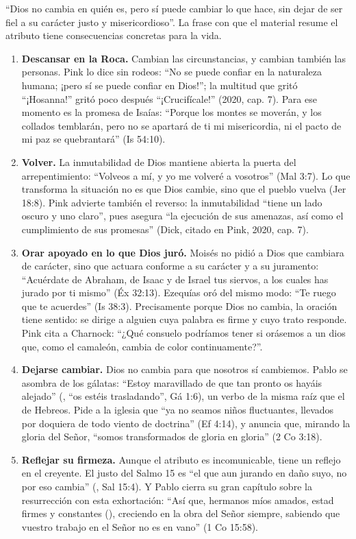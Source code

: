 ``Dios no cambia en quién es, pero sí puede cambiar lo que hace, sin dejar de ser fiel a su carácter justo y misericordioso''. La frase con que el material resume el atributo tiene consecuencias concretas para la vida.

\begin{enumerate}
\item \textbf{Descansar en la Roca.} Cambian las circunstancias, y cambian también las personas. Pink lo dice sin rodeos: ``No se puede confiar en la naturaleza humana; ¡pero sí se puede confiar en Dios!''; la multitud que gritó ``¡Hosanna!'' gritó poco después ``¡Crucifícale!'' (2020, cap. 7). Para ese momento es la promesa de Isaías: ``Porque los montes se moverán, y los collados temblarán, pero no se apartará de ti mi misericordia, ni el pacto de mi paz se quebrantará'' (Is 54:10).

\item \textbf{Volver.} La inmutabilidad de Dios mantiene abierta la puerta del arrepentimiento: ``Volveos a mí, y yo me volveré a vosotros'' (Mal 3:7). Lo que transforma la situación no es que Dios cambie, sino que el pueblo vuelva (Jer 18:8). Pink advierte también el reverso: la inmutabilidad ``tiene un lado oscuro y uno claro'', pues asegura ``la ejecución de sus amenazas, así como el cumplimiento de sus promesas'' (Dick, citado en Pink, 2020, cap. 7).

\item \textbf{Orar apoyado en lo que Dios juró.} Moisés no pidió a Dios que cambiara de carácter, sino que actuara conforme a su carácter y a su juramento: ``Acuérdate de Abraham, de Isaac y de Israel tus siervos, a los cuales has jurado por ti mismo'' (Éx 32:13). Ezequías oró del mismo modo: ``Te ruego que te acuerdes'' (Is 38:3). Precisamente porque Dios no cambia, la oración tiene sentido: se dirige a alguien cuya palabra es firme y cuyo trato responde. Pink cita a Charnock: ``¿Qué consuelo podríamos tener si orásemos a un dios que, como el camaleón, cambia de color continuamente?''.

\item \textbf{Dejarse cambiar.} Dios no cambia para que nosotros sí cambiemos. Pablo se asombra de los gálatas: ``Estoy maravillado de que tan pronto os hayáis alejado'' (, ``os estéis trasladando'', Gá 1:6), un verbo de la misma raíz que el  de Hebreos. Pide a la iglesia que ``ya no seamos niños fluctuantes, llevados por doquiera de todo viento de doctrina'' (Ef 4:14), y anuncia que, mirando la gloria del Señor, ``somos transformados de gloria en gloria'' (2 Co 3:18).

\item \textbf{Reflejar su firmeza.} Aunque el atributo es incomunicable, tiene un reflejo en el creyente. El justo del Salmo 15 es ``el que aun jurando en daño suyo, no por eso cambia'' (, Sal 15:4). Y Pablo cierra su gran capítulo sobre la resurrección con esta exhortación: ``Así que, hermanos míos amados, estad firmes y constantes (), creciendo en la obra del Señor siempre, sabiendo que vuestro trabajo en el Señor no es en vano'' (1 Co 15:58).
\end{enumerate}

